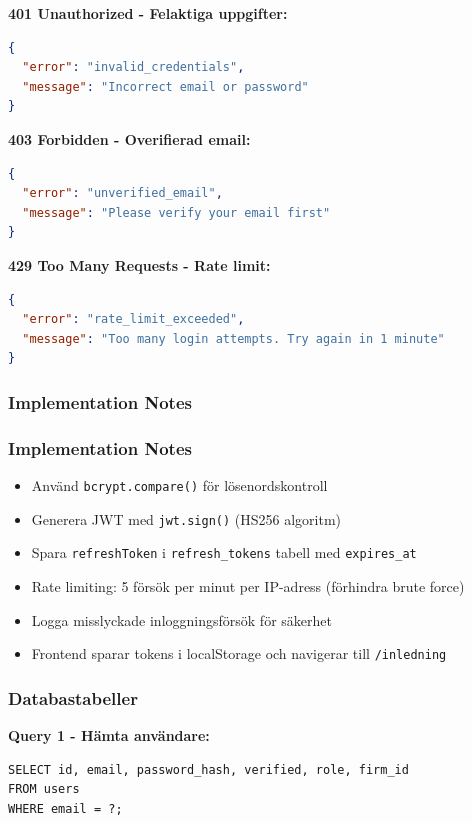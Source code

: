 \documentclass[12pt,a4paper]{article}
\begin{document}
\textbf{401 Unauthorized - Felaktiga uppgifter:}
\begin{lstlisting}[language=json]
{
  "error": "invalid_credentials",
  "message": "Incorrect email or password"
}
\end{lstlisting}

\textbf{403 Forbidden - Overifierad email:}
\begin{lstlisting}[language=json]
{
  "error": "unverified_email",
  "message": "Please verify your email first"
}
\end{lstlisting}

\textbf{429 Too Many Requests - Rate limit:}
\begin{lstlisting}[language=json]
{
  "error": "rate_limit_exceeded",
  "message": "Too many login attempts. Try again in 1 minute"
}
\end{lstlisting}

\subsubsection{Implementation Notes}
\subsubsection{Implementation Notes}
\begin{itemize}[noitemsep]
  \item Använd \texttt{bcrypt.compare()} för lösenordskontroll
  \item Generera JWT med \texttt{jwt.sign()} (HS256 algoritm)
  \item Spara \texttt{refreshToken} i \texttt{refresh\_tokens} tabell med \texttt{expires\_at}
  \item Rate limiting: 5 försök per minut per IP-adress (förhindra brute force)
  \item Logga misslyckade inloggningsförsök för säkerhet
  \item Frontend sparar tokens i localStorage och navigerar till \texttt{/inledning}
\end{itemize}

\subsubsection{Databastabeller}
\textbf{Query 1 - Hämta användare:}
\begin{verbatim}
SELECT id, email, password_hash, verified, role, firm_id 
FROM users 
WHERE email = ?;
\end{verbatim}
\end{document}
